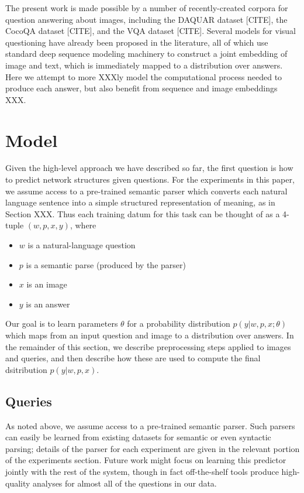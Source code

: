 \documentclass[10pt,twocolumn,letterpaper]{article}
\begin{document}
The present work is made possible by a number of recently-created corpora for question answering about images, including the DAQUAR dataset [CITE], the CocoQA dataset [CITE], and the VQA dataset [CITE]. Several models for visual questioning have already been proposed in the literature, all of which use standard deep sequence modeling machinery to construct a joint embedding of image and text, which is immediately mapped to a distribution over answers. Here we attempt to more XXXly model the computational process needed to produce each answer, but also benefit from sequence and image embeddings XXX.

\section{Model}

Given the high-level approach we have described so far, the first question is how to
predict network structures given questions.
For the experiments in this paper, we assume access to a pre-trained semantic parser
which converts each natural language sentence into a simple structured
representation of meaning, as in Section XXX. Thus each training datum for this
task can be thought of as a 4-tuple $(w, p, x, y)$, where
\begin{itemize}
  \item $w$ is a natural-language question
  \item $p$ is a semantic parse (produced by the parser)
  \item $x$ is an image
  \item $y$ is an answer
\end{itemize}
Our goal is to learn parameters $\theta$ for a probability distribution $p(y |
w, p, x; \theta)$
which maps from an input question and image to a distribution over answers. In
the remainder of this section, we describe preprocessing steps applied to images
and queries, and then describe how these are used to compute the final
dsitribution $p(y | w, p, x)$.

\subsection{Queries}

As noted above, we assume access to a pre-trained semantic parser. Such parsers
can easily be learned from existing datasets for semantic or even syntactic
parsing; details of the parser for each experiment are given in the relevant
portion of the experiments section. Future work might focus on learning this
predictor jointly with the rest of the system, though in fact off-the-shelf
tools produce high-quality analyses for almost all of the questions in our
data.
\end{document}
